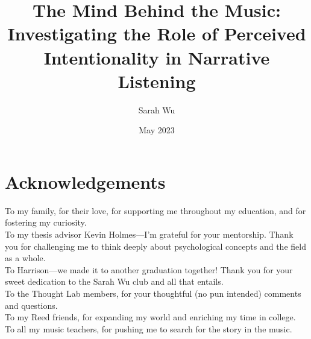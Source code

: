 \documentclass[12pt,twoside]{reedthesis}
\title{The Mind Behind the Music: \\Investigating the Role of Perceived Intentionality in Narrative Listening}
\author{Sarah Wu}
\date{May 2023}
\begin{document}
  \maketitle
  \frontmatter %
  \pagestyle{empty} %

    \chapter*{Acknowledgements}
	To my family, for their love, for supporting me throughout my education, and for fostering my curiosity. 
	\\

	\noindent To my thesis advisor Kevin Holmes—I'm grateful for your mentorship. Thank you for challenging me to think deeply about psychological concepts and the field as a whole. 
	\\

	\noindent To Harrison—we made it to another graduation together! Thank you for your sweet dedication to the Sarah Wu club and all that entails. 
	\\

	\noindent To the Thought Lab members, for your thoughtful (no pun intended) comments and questions. 
	\\

	\noindent To my Reed friends, for expanding my world and enriching my time in college. 
	\\

	\noindent To all my music teachers, for pushing me to search for the story in the music.
	

	
	

\end{document}
